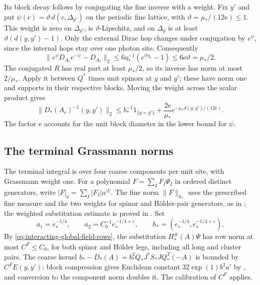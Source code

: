 Its block decay follows by conjugating the fine
inverse with a weight. Fix $y'$ and put
$\psi(c)=\vartheta\,d(c,\Delta_{y'})$ on the
periodic fine lattice, with
$\vartheta=\mu_*/(12\mathrm e)\le1$.
This weight is zero on $\Delta_{y'}$, is
$\vartheta$-Lipschitz, and on $\Delta_y$ is
at least $\vartheta(d(y,y')-1)$.
Only the external Dirac hop changes under
conjugation by $e^\psi$, since the internal
hops stay over one photon site. Consequently
\[
 \|e^\psi D_{A_r}e^{-\psi}-D_{A_r}\|_2
 \le6\eta_*^{-1}(e^{\vartheta\eta_*}-1)
 \le6\mathrm e\vartheta=\mu_*/2.
\]
The conjugated $R$ has real part at least
$\mu_*/2$, so its inverse has norm at most
$2/\mu_*$. Apply it between $Q^*$ times
unit spinors at $y$ and $y'$; these have
norm one and supports in their respective
blocks. Moving the weight across the
scalar product gives
\begin{equation}\label{eq:interacting-real-covariance-decay}
 \|D_*(A_r)^{-1}(y,y')\|_2
  \le b_*^{-1}1_{\{y=y'\}}+
       \frac{2\mathrm e}{\mu_*}
                       e^{-\mu_*d(y,y')/(12\mathrm e)}.
\end{equation}
The factor $\mathrm e$ accounts for the unit
block diameter in the lower bound for $\psi$.
\subsection{The terminal Grassmann norms}
\label{subsec:interacting-terminal-norms}

The terminal integral is over four coarse
components per unit site, with Grassmann
weight one. For a polynomial
$F=\sum_I F_I\Psi_I$ in ordered distinct generators,
write $|F|_a=\sum_I|F_I|a^{|I|}$.
The fine norm $\|F\|_{h_*}$ uses the prescribed fine measure
and the two weights for spinor and H\"older-pair generators,
as in \cite[(4)--(5)]{NormalizedContraction};
the weighted substitution estimate is proved in
\cite[Proposition~5.1]{FermionBlock}.
Set
\[
 a_1=e_*^{-1/4},\qquad
 a_2=C_0^{-1}e_*^{-1/4+\varepsilon},\qquad
 h_*=(e_*^{-1/4},e_*^{-1/4+\varepsilon}).
\]
By \eqref{eq:interacting-global-field-rows},
the substitution $H_*^\#(A)\Psi$ has row
norm at most $C^F\le C_0$, for both spinor
and H\"older legs, including all long
and cluster pairs. The coarse kernel
$b_*-D_*(A)=b_*^2Q_*J^*S_*JQ_*^T(-A)$
is bounded by $C^FE(y,y')$: block
compression gives Euclidean constant
$32\exp(1)b^2a'$ by
\cite[(60)]{FermionBlock}, and
conversion to the component norm doubles
it. The calibration of $C^F$ applies.

